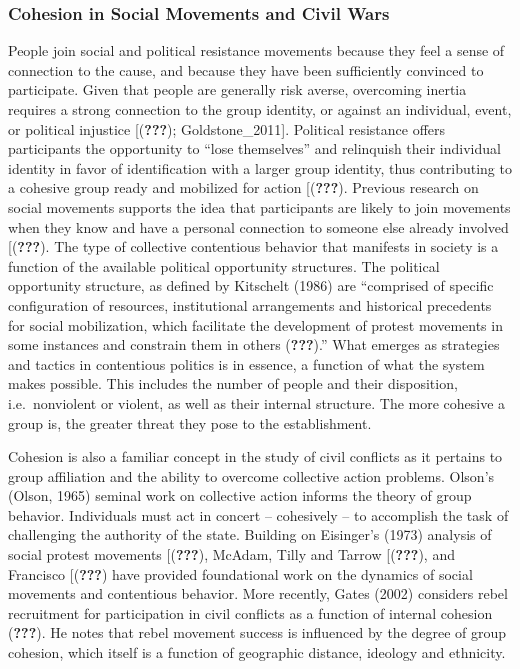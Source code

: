 \documentclass[english,man]{apa6}
\begin{document}
\hypertarget{cohesion-in-social-movements-and-civil-wars}{%
\subsubsection{Cohesion in Social Movements and Civil Wars}\label{cohesion-in-social-movements-and-civil-wars}}

People join social and political resistance movements because they feel a sense of connection to the cause, and because they have been sufficiently convinced to participate. Given that people are generally risk averse, overcoming inertia requires a strong connection to the group identity, or against an individual, event, or political injustice {[}({\textbf{???}}); Goldstone\_2011{]}. Political resistance offers participants the opportunity to \enquote{lose themselves} and relinquish their individual identity in favor of identification with a larger group identity, thus contributing to a cohesive group ready and mobilized for action {[}({\textbf{???}}). Previous research on social movements supports the idea that participants are likely to join movements when they know and have a personal connection to someone else already involved {[}({\textbf{???}}). The type of collective contentious behavior that manifests in society is a function of the available political opportunity structures. The political opportunity structure, as defined by Kitschelt (1986) are \enquote{comprised of specific configuration of resources, institutional arrangements and historical precedents for social mobilization, which facilitate the development of protest movements in some instances and constrain them in others ({\textbf{???}}).} What emerges as strategies and tactics in contentious politics is in essence, a function of what the system makes possible. This includes the number of people and their disposition, i.e.~nonviolent or violent, as well as their internal structure. The more cohesive a group is, the greater threat they pose to the establishment.

Cohesion is also a familiar concept in the study of civil conflicts as it pertains to group affiliation and the ability to overcome collective action problems. Olson's (Olson, 1965) seminal work on collective action informs the theory of group behavior. Individuals must act in concert -- cohesively -- to accomplish the task of challenging the authority of the state. Building on Eisinger's (1973) analysis of social protest movements {[}({\textbf{???}}), McAdam, Tilly and Tarrow {[}({\textbf{???}}), and Francisco {[}({\textbf{???}}) have provided foundational work on the dynamics of social movements and contentious behavior. More recently, Gates (2002) considers rebel recruitment for participation in civil conflicts as a function of internal cohesion ({\textbf{???}}). He notes that rebel movement success is influenced by the degree of group cohesion, which itself is a function of geographic distance, ideology and ethnicity.
\end{document}

